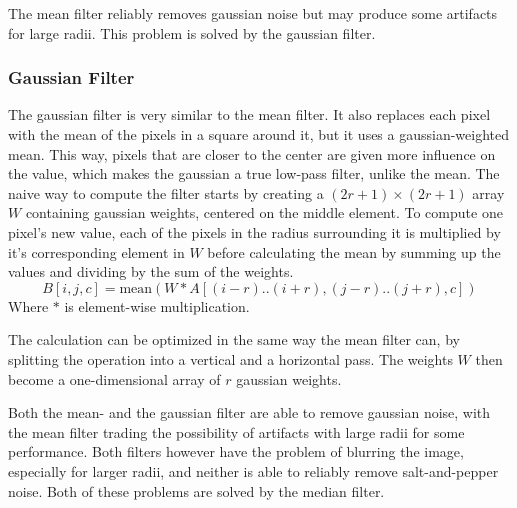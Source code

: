 \documentclass[sigconf]{acmart}
\begin{document}
The mean filter reliably removes gaussian noise but may produce some artifacts for large radii. This problem is solved by the gaussian filter.

\subsubsection{Gaussian Filter}
The gaussian filter is very similar to the mean filter. It also replaces each pixel with the mean of the pixels in a square around it, but it uses a gaussian-weighted mean. This way, pixels that are closer to the center are given more influence on the value, which makes the gaussian a true low-pass filter, unlike the mean. The naive way to compute the filter starts by creating a $(2r+1) \times (2r+1)$ array $W$ containing gaussian weights, centered on the middle element. To compute one pixel's new value, each of the pixels in the radius surrounding it is multiplied by it's corresponding element in $W$ before calculating the mean by summing up the values and dividing by the sum of the weights.
$$
B[i,j,c] = \text{mean}(W*A[(i-r)..(i+r), (j-r)..(j+r), c])
$$
Where $*$ is element-wise multiplication.

The calculation can be optimized in the same way the mean filter can, by splitting the operation into a vertical and a horizontal pass. The weights $W$ then become a one-dimensional array of $r$ gaussian weights.

Both the mean- and the gaussian filter are able to remove gaussian noise, with the mean filter trading the possibility of artifacts with large radii for some performance. Both filters however have the problem of blurring the image, especially for larger radii, and neither is able to reliably remove salt-and-pepper noise. Both of these problems are solved by the median filter.
\end{document}

